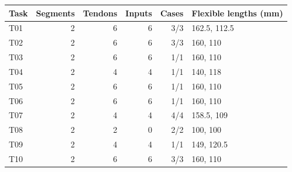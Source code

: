 \begin{tabular}{lrrrrl}
\toprule
Task & Segments & Tendons & Inputs & Cases & Flexible lengths (mm) \\
\midrule
T01 & 2 & 6 & 6 & 3/3 & 162.5, 112.5 \\
T02 & 2 & 6 & 6 & 3/3 & 160, 110 \\
T03 & 2 & 6 & 6 & 1/1 & 160, 110 \\
T04 & 2 & 4 & 4 & 1/1 & 140, 118 \\
T05 & 2 & 6 & 6 & 1/1 & 160, 110 \\
T06 & 2 & 6 & 6 & 1/1 & 160, 110 \\
T07 & 2 & 4 & 4 & 4/4 & 158.5, 109 \\
T08 & 2 & 2 & 0 & 2/2 & 100, 100 \\
T09 & 2 & 4 & 4 & 1/1 & 149, 120.5 \\
T10 & 2 & 6 & 6 & 3/3 & 160, 110 \\
\bottomrule
\end{tabular}
